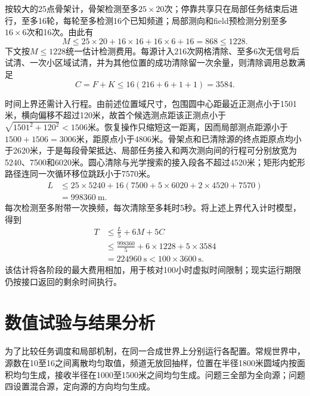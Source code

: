 \documentclass[UTF8,fontset=fandol,a4paper,zihao=-4]{ctexart}
\begin{document}
按较大的25点骨架计，骨架检测至多$25\times20$次；停靠共享只在局部任务结束后进行，至多16轮，每轮至多检测16个已知频道；局部测向和field预检测分别至多$16\times6$次和16次。由此有
\begin{equation}\label{eq:measurement-bound}
M\le25\times20+16\times16+16\times6+16=868\le1228.
\end{equation}
下文按$M\le1228$统一估计检测费用。每源计入216次网格清除、至多6次无信号后试清、一次小区域试清，并为其他位置的成功清除留一次余量，则清除调用总数满足
\begin{equation}\label{eq:clear-call-bound}
C=F+K\le16(216+6+1+1)=3584.
\end{equation}

时间上界还需计入行程。由前述位置域尺寸，包围圆中心距最近正测点小于1501米，横向偏移不超过120米，故首个候选测点距该正测点小于$\sqrt{1501^2+120^2}<1506$米。恢复操作只缩短这一距离，因而局部测点距源小于$1500+1506=3006$米，距原点小于4806米。骨架点和已清除源的终点距原点均小于2620米，于是每段骨架抵达、局部任务接入和两次测向间的行程可分别放宽为5240、7500和6020米。圆心清除与光学搜索的接入段各不超过4520米；矩形内蛇形路径连同一次循环移位跳跃小于7570米。
\begin{equation}\label{eq:travel-bound}
\begin{aligned}
L&\le25\times5240+
16(7500+5\times6020+2\times4520+7570)\\
&=998360\ \mathrm m.
\end{aligned}
\end{equation}
每次检测至多附带一次换频，每次清除至多耗时5秒。将上述上界代入计时模型，得到
\begin{equation}\label{eq:virtual-time-bound}
\begin{aligned}
T&\le\frac L5+6M+5C\\
&\le\frac{998360}{5}+6\times1228+5\times3584\\
&=224960\ \mathrm s<100\times3600\ \mathrm s.
\end{aligned}
\end{equation}
该估计将各阶段的最大费用相加，用于核对100小时虚拟时间限制；现实运行期限仍按接口返回的剩余时间执行。

\section{数值试验与结果分析}\label{sec:experiments}
为了比较任务调度和局部机制，在同一合成世界上分别运行各配置。常规世界中，源数在10至16之间离散均匀取值，频道无放回抽样，位置在半径1800米圆域内按面积均匀生成，接收半径在1000至1500米之间均匀生成。问题三全部为全向源；问题四设置混合源，定向源的方向均匀生成。
\end{document}
